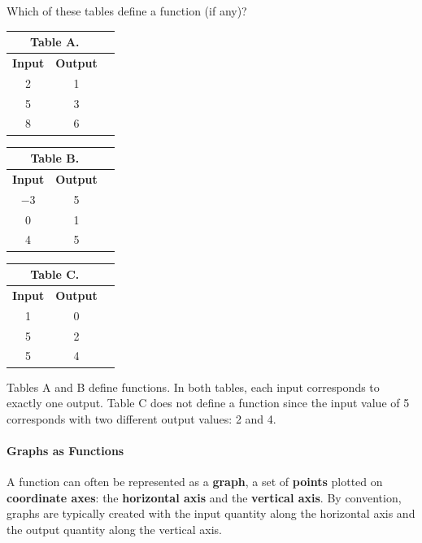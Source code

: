 \begin{example}

Which of these tables define a function (if any)?

\begin{center}
\begin{tabular}{ccc}
\multicolumn{2}{c}{Table A.}\\
\toprule
{\bf Input} & {\bf Output}\\
\toprule
2 & 1 \\
\midrule
5 & 3 \\
\midrule
8 & 6 \\
\bottomrule
\end{tabular}
\quad
\begin{tabular}{ccc}
\multicolumn{2}{c}{Table B.}\\
\toprule
{\bf Input} & {\bf Output}\\
\toprule
$-3$ & 5 \\
\midrule
0 & 1 \\
\midrule
4 & 5 \\
\bottomrule
\end{tabular}
\quad
\begin{tabular}{ccc}
\multicolumn{2}{c}{Table C.}\\
\toprule
{\bf Input} & {\bf Output}\\
\toprule
1 & 0 \\
\midrule
5 & 2 \\
\midrule
5 & 4 \\
\bottomrule
\end{tabular}
\end{center}

\begin{solution} Tables A and B define functions. In both tables, each input corresponds to exactly one output. Table C does not define a function since the input value of 5 corresponds with two different
output values: 2 and 4.
\end{solution}\end{example}



\paragraph{Graphs as Functions}

A function can often be represented as a {\bf graph}, a set of {\bf points} plotted on {\bf coordinate axes}: the {\bf horizontal axis} and the {\bf vertical axis}. By convention, graphs are typically created with the input quantity along the horizontal axis and the output quantity along the vertical axis.

